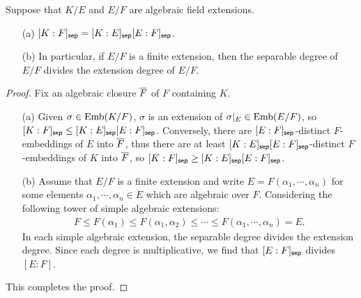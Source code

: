 \begin{lem}\label{separable extn. multiplicativity}
    Suppose that $K/E$ and $E/F$ are algebraic field extensions.
    \begin{enumerate}
        \item[(a)]
        {
            $[K:F]_{\textsf{sep}}=[K:E]_{\textsf{sep}}[E:F]_{\textsf{sep}}$.
        }
        \item[(b)]
        {
            In particular, if $E/F$ is a finite extension, then the separable degree of $E/F$ divides the extension degree of $E/F$.
        }
    \end{enumerate}
\end{lem}
\begin{proof}
    Fix an algebraic closure $\overline{F}$ of $F$ containing $K$.
    \begin{enumerate}
        \item[(a)]
        {
            Given $\sigma\in{\textrm{Emb}({K/F})}$, $\sigma$ is an extension of $\sigma|_E\in{\textrm{Emb}({E/F})}$, so $[K:F]_{\textsf{sep}}\leq[K:E]_{\textsf{sep}}[E:F]_{\textsf{sep}}$.
            Conversely, there are $[E:F]_{\textsf{sep}}$-distinct $F$-embeddings of $E$ into $\overline{F}$, thus there are at least $[K:E]_{\textsf{sep}}[E:F]_{\textsf{sep}}$-distinct $F$-embeddings of $K$ into $\overline{F}$, so $[K:F]_{\textsf{sep}}\geq[K:E]_{\textsf{sep}}[E:F]_{\textsf{sep}}$.
        }
        \item[(b)]
        {
            Assume that $E/F$ is a finite extension and write $E=F(\alpha_1, \cdots, \alpha_n)$ for some elements $\alpha_1, \cdots, \alpha_n\in E$ which are algebraic over $F$.
            Considering the following tower of simple algebraic extensions:
            \begin{align*}
                F\leq F(\alpha_1)\leq F(\alpha_1, \alpha_2)\leq \cdots \leq F(\alpha_1, \cdots, \alpha_n)=E.
            \end{align*}
            In each simple algebraic extension, the separable degree divides the extension degree.
            Since each degree is multiplicative, we find that $[E:F]_{\textsf{sep}}$ divides $[E:F]$.
        }
    \end{enumerate}
    This completes the proof.
\end{proof}

